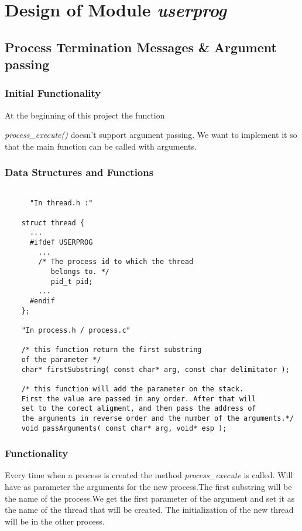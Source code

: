 \chapter{Design of Module \textit{userprog}}


\section{Process Termination Messages \& Argument passing}

    \subsection{Initial Functionality}

	At the beginning of this project the function {\textit{process\_execute()} doesn't support argument passing. We want to implement it so that the main function can be called with arguments.

    \subsection{Data Structures and Functions}

    \begin{lstlisting}

      "In thread.h :"
	
	struct thread {
	  ...
	  #ifdef USERPROG
	    ...
	    /* The process id to which the thread
	       belongs to. */
	       pid_t pid;
	    ...
	  #endif
	};

	"In process.h / process.c"

	/* this function return the first substring 
	of the parameter */
	char* firstSubstring( const char* arg, const char delimitator );

	/* this function will add the parameter on the stack.
	First the value are passed in any order. After that will 
	set to the corect aligment, and then pass the address of
	the arguments in reverse order and the number of the arguments.*/
	void passArguments( const char* arg, void* esp );

    \end{lstlisting}


    \subsection{Functionality}

	  Every time when a process is created the method \textit{process\_execute} is called. Will have as parameter the arguments for the new process.The first substring will be the name of the process.We get the first parameter of the argument and set it as the name of the thread that will be created. The initialization of the new thread will be in the other process.

}
